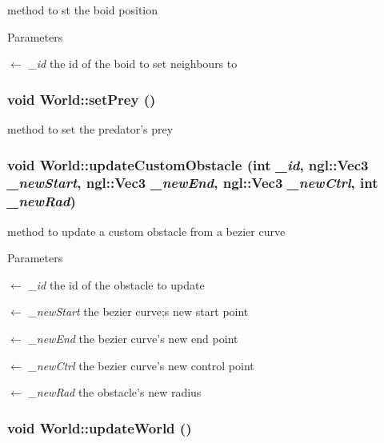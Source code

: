 method to st the boid position 
\begin{DoxyParams}{Parameters}
\item[\mbox{$\leftarrow$} {\em \_\-id}]the id of the boid to set neighbours to \end{DoxyParams}
\hypertarget{classWorld_aa18cf24d003115671d485ad986aeb218}{
\subsubsection[{setPrey}]{\setlength{\rightskip}{0pt plus 5cm}void World::setPrey ()}}
\label{classWorld_aa18cf24d003115671d485ad986aeb218}


method to set the predator's prey \hypertarget{classWorld_a0eacd7939c104da33aa14bed6667a193}{
\subsubsection[{updateCustomObstacle}]{\setlength{\rightskip}{0pt plus 5cm}void World::updateCustomObstacle (int {\em \_\-id}, \/  ngl::Vec3 {\em \_\-newStart}, \/  ngl::Vec3 {\em \_\-newEnd}, \/  ngl::Vec3 {\em \_\-newCtrl}, \/  int {\em \_\-newRad})}}
\label{classWorld_a0eacd7939c104da33aa14bed6667a193}


method to update a custom obstacle from a bezier curve 
\begin{DoxyParams}{Parameters}
\item[\mbox{$\leftarrow$} {\em \_\-id}]the id of the obstacle to update \item[\mbox{$\leftarrow$} {\em \_\-newStart}]the bezier curve;s new start point \item[\mbox{$\leftarrow$} {\em \_\-newEnd}]the bezier curve's new end point \item[\mbox{$\leftarrow$} {\em \_\-newCtrl}]the bezier curve's new control point \item[\mbox{$\leftarrow$} {\em \_\-newRad}]the obstacle's new radius \end{DoxyParams}
\hypertarget{classWorld_aea055bac16c4cb8886e70f670f46f044}{
\subsubsection[{updateWorld}]{\setlength{\rightskip}{0pt plus 5cm}void World::updateWorld ()}}
\label{classWorld_aea055bac16c4cb8886e70f670f46f044}


